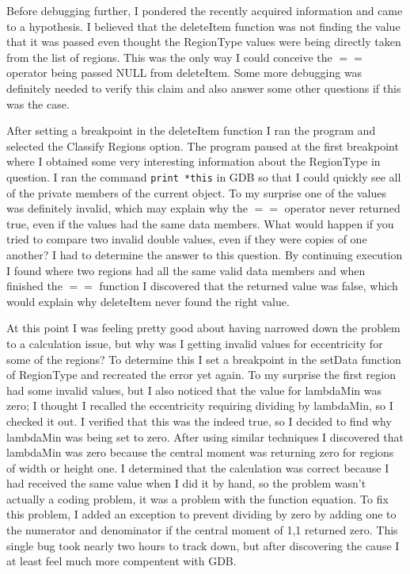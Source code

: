 \documentclass[pdftex, 12pt]{article}
\begin{document}
\begin{description}
\begin{description}
\begin{description}
				Before debugging further, I pondered the recently acquired information and came to a hypothesis.  I believed that the
				deleteItem function was not finding the value that it was passed even thought the RegionType values were being directly
				taken from the list of regions.  This was the only way I could conceive the $==$ operator being passed NULL from
				deleteItem.  Some more debugging was definitely needed to verify this claim and also answer some other questions if this
				was the case.

				After setting a breakpoint in the deleteItem function I ran the program and selected the Classify Regions option.  The
				program paused at the first breakpoint where I obtained some very interesting information about the RegionType in
				question.  I ran the command \texttt{print *this} in GDB so that I could quickly see all of the private members of the
				current object.  To my surprise one of the values was definitely invalid, which may explain why the $==$ operator never
				returned true, even if the values had the same data members.  What would happen if you tried to compare two invalid double
				values, even if they were copies of one another?  I had to determine the answer to this question.  By continuing execution
				I found where two regions had all the same valid data members and when finished the $==$ function I discovered that the
				returned value was false, which would explain why deleteItem never found the right value.

				At this point I was feeling pretty good about having narrowed down the problem to a calculation issue, but why was I
				getting invalid values for eccentricity for some of the regions?  To determine this I set a breakpoint in the
				setData function of RegionType and recreated the error yet again.  To my surprise the first region had some invalid
				values, but I also noticed that the value for lambdaMin was zero; I thought I recalled the eccentricity requiring
				dividing by lambdaMin, so I checked it out.  I verified that this was the indeed true, so I decided to find why
				lambdaMin was being set to zero.  After using similar techniques I discovered that lambdaMin was zero because the central
				moment was returning zero for regions of width or height one.  I determined that the calculation was correct because I
				had received the same value when I did it by hand, so the problem wasn't actually a coding problem, it was a problem with
				the function equation.  To fix this problem, I added an exception to prevent dividing by zero by adding one to the
				numerator and denominator if the central moment of 1,1 returned zero.  This single bug took nearly two hours to track
				down, but after discovering the cause I at least feel much more compentent with GDB.



\end{description}
\end{description}
\end{description}
\end{document}
